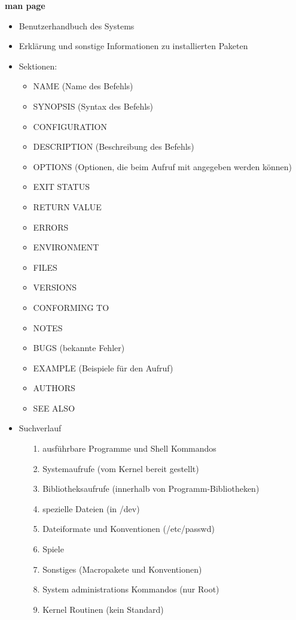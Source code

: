 \documentclass[12pt,utf8, 10pt]{article}
\begin{document}
\textbf{man page}
\begin{itemize}
	\item Benutzerhandbuch des Systems
	\item Erklärung und sonstige Informationen zu installierten Paketen
	\item Sektionen:
	\begin{itemize}
		\item NAME (Name des Befehls)
		\item SYNOPSIS (Syntax des Befehls)
		\item CONFIGURATION
		\item DESCRIPTION (Beschreibung des Befehls)
		\item OPTIONS (Optionen, die beim Aufruf mit angegeben werden können)
		\item EXIT STATUS
		\item RETURN VALUE
		\item ERRORS
		\item ENVIRONMENT
		\item FILES
		\item VERSIONS
		\item CONFORMING TO
		\item NOTES
		\item BUGS (bekannte Fehler)
		\item EXAMPLE (Beispiele für den Aufruf)
		\item AUTHORS
		\item SEE ALSO
	\end{itemize}
	\item Suchverlauf
	\begin{itemize}
		\item[1.] ausführbare Programme und Shell Kommandos
        \item[2.] Systemaufrufe (vom Kernel bereit gestellt)
        \item[3.] Bibliotheksaufrufe (innerhalb von Programm-Bibliotheken)
        \item[4.] spezielle Dateien (in /dev)
        \item[5.] Dateiformate und Konventionen (/etc/passwd)
        \item[6.] Spiele
        \item[7.] Sonstiges (Macropakete und Konventionen)
        \item[8.] System administrations Kommandos (nur Root)
        \item[9.] Kernel Routinen (kein Standard)
	\end{itemize}
\end{itemize}
\end{document}
